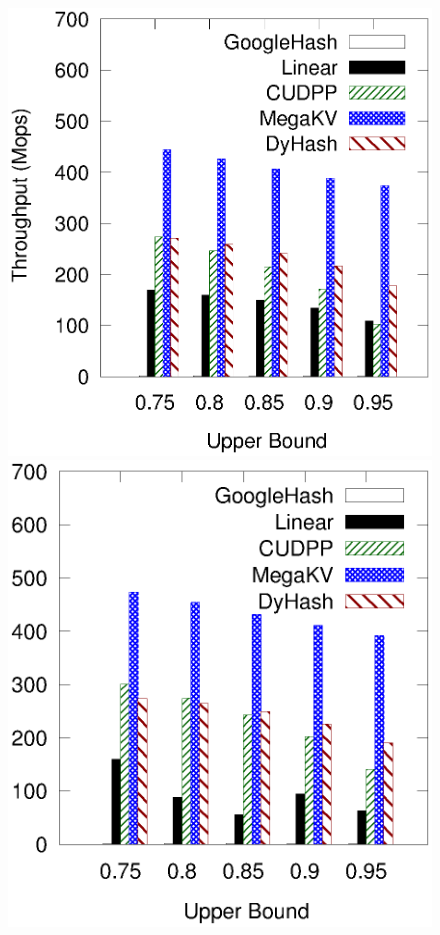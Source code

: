 \begin{figure}[t!]
	\begin{minipage}{0.19\linewidth}\centering
		\includegraphics[width=\linewidth]{pic/static-upper/upper_insert_twitter.eps}
		\centerline{\dstwitter}
	\end{minipage}
	\hfill
	\begin{minipage}{0.19\linewidth}\centering
		\includegraphics[width=\linewidth]{pic/static-upper/upper_insert_reddit.eps}

\end{minipage}
\end{figure}
